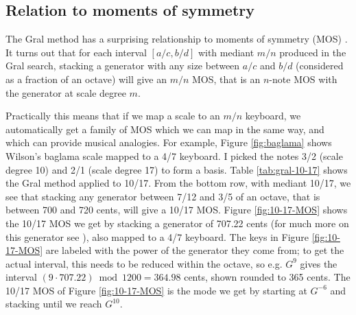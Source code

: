 \documentclass[a4paper,11pt]{article}
\begin{document}
\clearpage
\subsection{Relation to moments of symmetry}
\label{subsec:relation}
The Gral method has a surprising relationship to moments of symmetry (MOS)
\cite{wilsonmos}.\footnotemark{} It turns out \cite{carey2012two} that for each
interval $[a/c, b/d]$ with mediant $m/n$ produced in the Gral search, stacking
a generator with any size between $a/c$ and $b/d$ (considered as a fraction of
an octave) will give an $m/n$ MOS, that is an $n$-note MOS with the generator
at scale degree $m$.


Practically this means that if we map a scale to an $m/n$ keyboard, we
automatically get a family of MOS which we can map in the same way, and which
can provide musical analogies. For example, Figure \ref{fig:baglama} shows
Wilson's baglama scale \cite{wilson1975development} mapped to a 4/7 keyboard. I
picked the notes 3/2 (scale degree 10) and 2/1 (scale degree 17) to form a
basis. Table \ref{tab:gral-10-17} shows the Gral method applied to 10/17. From
the bottom row, with mediant 10/17, we see that stacking any generator between
7/12 and 3/5 of an octave, that is between 700 and 720 cents, will give a 10/17
MOS. Figure \ref{fig:10-17-MOS} shows the 10/17 MOS we get by stacking a
generator of 707.22 cents (for much more on this generator see
\cite{schulter2006secor}), also mapped to a 4/7 keyboard. The keys in Figure
\ref{fig:10-17-MOS} are labeled with the power of the generator they come from;
to get the actual interval, this needs to be reduced within the octave, so e.g.
$G^{9}$ gives the interval $(9 \cdot 707.22) \bmod 1200 = 364.98$ cents, shown
rounded to 365 cents. The 10/17 MOS of Figure \ref{fig:10-17-MOS} is the mode
we get by starting at $G^{-6}$ and stacking until we reach $G^{10}$.
\end{document}
